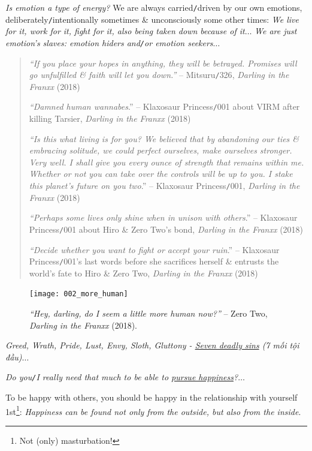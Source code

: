 \documentclass[12pt,oneside]{book}
\begin{document}
{\it Is emotion a type of energy?} We are always carried{\tt/}driven by our own emotions, deliberately{\tt/}intentionally sometimes \& unconsciously some other times: {\it We live for it, work for it, fight for it, also being taken down because of it}$\ldots$ {\it We are just emotion's slaves: emotion hiders and{\tt/}or emotion seekers}$\ldots$
\begin{quotation}
	{\it``If you place your hopes in anything, they will be betrayed. Promises will go unfulfilled \& faith will let you down.''} -- {\sf Mitsuru{\tt/}326}, {\it{\sc Darling} in the {\sc Franxx}} (2018)
	
	{\it``Damned human wannabes}.'' -- Klaxosaur Princess{\tt/}001 about VIRM after killing Tarsier, {\it {\sc Darling} in the {\sc Franxx}} (2018)
	
	{\it``Is this what living is for you? We believed that by abandoning our ties \& embracing solitude, we could perfect ourselves, make ourselves stronger. Very well. I shall give you every ounce of strength that remains within me. Whether or not you can take over the controls will be up to you. I stake this planet's future on you two}.'' -- Klaxosaur Princess{\tt/}001, {\it {\sc Darling} in the {\sc Franxx}} (2018)
	
	{\it``Perhaps some lives only shine when in unison with others}.'' -- Klaxosaur Princess{\tt/}001 about Hiro \& Zero Two's bond, {\it {\sc Darling} in the {\sc Franxx}} (2018)
	
	{\it``Decide whether you want to fight or accept your ruin}.'' -- Klaxosaur Princess{\tt/}001's last words before she sacrifices herself \& entrusts the world's fate to Hiro \& Zero Two, {\it {\sc Darling} in the {\sc Franxx}} (2018)
\end{quotation}

\begin{figure}[H]
	\centering
	\texttt{[image: 002\_more\_human]}
	\caption{{\it``Hey, darling, do I seem a little more human now?''} -- Zero Two, {\it {\sc Darling} in the {\sc Franxx}} (2018).}
	\label{fig5}
\end{figure}
{\it Greed, Wrath, Pride, Lust, Envy, Sloth, Gluttony - \href{https://en.wikipedia.org/wiki/Seven_deadly_sins}{Seven deadly sins} (7 mối tội đầu)}$\ldots$

{\it Do you{\tt/}I really need that much to be able to \href{https://www.imdb.com/title/tt0454921/}{pursue happiness}?}$\ldots$

To be happy with others, you should be happy in the relationship with yourself 1st\footnote{Not (only) masturbation!}: {\it Happiness can be found not only from the outside, but also from the inside}.
\end{document}
